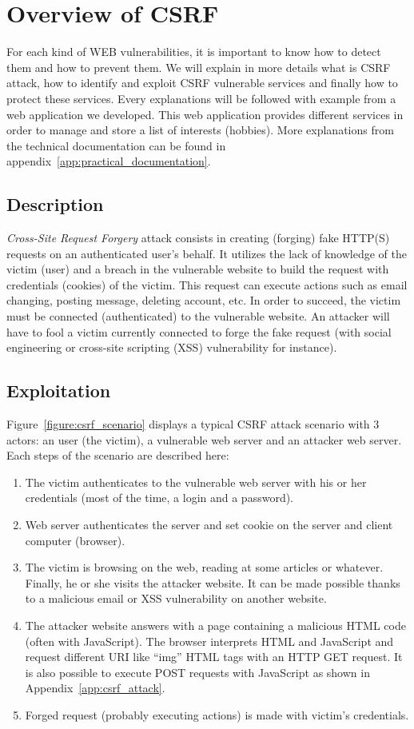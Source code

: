 \documentclass[a4paper,11pt,openany]{report}
\newcommand{\csrf}{\textit{Cross-Site Request Forgery}}
\begin{document}
  \section{Overview of CSRF}
  For each kind of WEB vulnerabilities, it is important to know how to detect them and 
  how to prevent them. We will explain in more details what is CSRF attack, how to 
  identify and exploit CSRF vulnerable services and finally how to protect these services. 
  Every explanations will be followed with example from a web application we developed. 
  This web application provides different services in order to manage and store a list of 
  interests (hobbies). More explanations from the technical documentation can be found 
  in appendix~\ref{app:practical_documentation}.
  
  \subsection{Description}
  \csrf{} attack consists in creating (forging) fake HTTP(S) requests on an authenticated 
  user's behalf. It utilizes the lack of knowledge of the victim (user) and a breach in 
  the vulnerable website to build the request with credentials (cookies) of the victim. This 
  request can execute actions such as email changing, posting message, deleting account, etc.
  In order to succeed, the victim must be connected (authenticated) to the vulnerable website. 
  An attacker will have to fool a victim currently connected to forge the fake request (with 
  social engineering or cross-site scripting (XSS)\cite{wikipedia_xss} vulnerability for 
  instance).
  
  \subsection{Exploitation}
  Figure~\ref{figure:csrf_scenario} displays a typical CSRF attack scenario with 3 actors: an 
  user (the victim), a vulnerable web server and an attacker web server. Each steps of the 
  scenario are described here:
  \begin{enumerate}
   \item The victim authenticates to the vulnerable web server with his or her credentials (most 
   of the time, a login and a password).
   \item Web server authenticates the server and set cookie on the server and client computer 
   (browser).
   \item The victim is browsing on the web, reading at some articles or whatever. Finally, he or 
   she visits the attacker website. It can be made possible thanks to a malicious email or XSS 
   vulnerability on another website.
   \item The attacker website answers with a page containing a malicious HTML code (often with 
   JavaScript). The browser interprets HTML and JavaScript and request different URI like ``img'' 
   HTML tags with an HTTP GET request. It is also possible to execute POST requests with JavaScript 
   as shown in Appendix~\ref{app:csrf_attack}.
   \item Forged request (probably executing actions) is made with victim's credentials.
  \end{enumerate}
  
\end{document}

